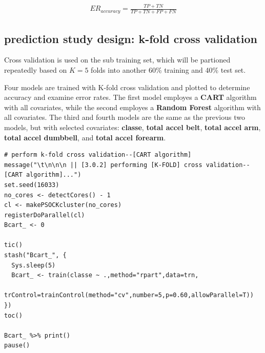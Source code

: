 \documentclass[10pt, twoside]{article}
\begin{document}
\begin{equation*}
\begin{aligned}
ER_{accuracy} = \frac{TP + TN}{TP + TN + FP + FN}
\end{aligned}
\end{equation*}
\bigskip

\begin{center}
\subsection{prediction study design: k-fold cross validation}
\vspace{-3ex}
\end{center}

\noindent
Cross validation is used on the sub training set, which will be partioned repeatedly based
on $K = 5$ folds into another 60\% training and 40\% test set. 
\smallskip

Four models are trained with K-fold cross validation and plotted to determine accuracy and
examine error rates. The first model employes a \textbf{CART} algorithm with all covariates, while
the second employes a \textbf{Random Forest} algorithm with all covariates. The third and fourth models
are the same as the previous two models, but with selected covariates: \textbf{classe}, \textbf{total accel belt},
\textbf{total accel arm}, \textbf{total accel dumbbell}, and \textbf{total accel forearm}.
\bigskip

\begin{verbatim}
# perform k-fold cross validation--[CART algorithm]
message("\t\n\n\n || [3.0.2] performing [K-FOLD] cross validation--[CART algorithm]...")
set.seed(16033)
no_cores <- detectCores() - 1
cl <- makePSOCKcluster(no_cores)
registerDoParallel(cl)
Bcart_ <- 0

tic()
stash("Bcart_", {
  Sys.sleep(5)
  Bcart_ <- train(classe ~ .,method="rpart",data=trn,
      trControl=trainControl(method="cv",number=5,p=0.60,allowParallel=T))
})
toc()

Bcart_ %>% print()
pause()
\end{verbatim}
\end{document}
